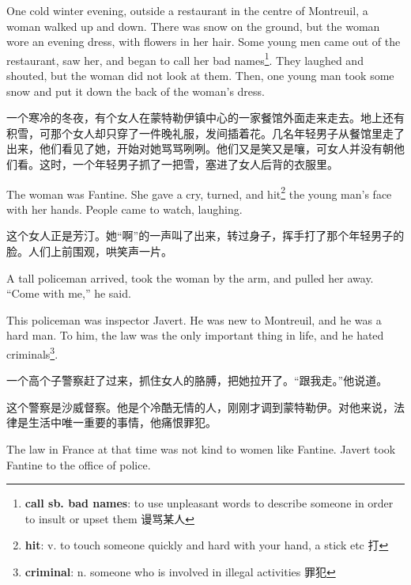 \documentclass[fontset=ubuntu, zihao=5]{ctexart}
\begin{document}
\begin{paracol}{2}
  \switchcolumn*

  One cold winter evening, outside a restaurant in the centre of Montreuil, a
  woman walked up and down. There was snow on the ground, but the woman wore
  an evening dress, with flowers in her hair. Some young men came out of the
  restaurant, saw her, and began to call her bad names\footnote{\textbf{call
      sb. bad names}: to use unpleasant words to describe someone in order to
    insult or upset them 谩骂某人}. They laughed and shouted, but the woman
  did not look at them. Then, one young man took some snow and put it down the
  back of the woman's dress.

  \switchcolumn

  一个寒冷的冬夜，有个女人在蒙特勒伊镇中心的一家餐馆外面走来走去。地上还有积雪，可那个女人却只穿了一件晚礼服，发间插着花。几名年轻男子从餐馆里走了出来，他们看见了她，开始对她骂骂咧咧。他们又是笑又是嚷，可女人并没有朝他们看。这时，一个年轻男子抓了一把雪，塞进了女人后背的衣服里。

  \switchcolumn*

  The woman was Fantine. She gave a cry, turned, and
  hit\footnote{\textbf{hit}: v. to touch someone quickly and hard with your
    hand, a stick etc 打} the young man's face with her hands. People came to
  watch, laughing.

  \switchcolumn

  这个女人正是芳汀。她“啊”的一声叫了出来，转过身子，挥手打了那个年轻男子的脸。人们上前围观，哄笑声一片。

  \switchcolumn*

  A tall policeman arrived, took the woman by the arm, and pulled her away. ``Come with me,'' he said.


  This policeman was inspector Javert. He was new to Montreuil, and he was a hard man. To him, the law was the only important thing in life, and he hated criminals\footnote{\textbf{criminal}: n. someone who is involved in illegal activities 罪犯}.

  \switchcolumn

  一个高个子警察赶了过来，抓住女人的胳膊，把她拉开了。“跟我走。”他说道。


  这个警察是沙威督察。他是个冷酷无情的人，刚刚才调到蒙特勒伊。对他来说，法律是生活中唯一重要的事情，他痛恨罪犯。

  \switchcolumn*

  The law in France at that time was not kind to women like Fantine. Javert took Fantine to the office of police.


\end{paracol}
\end{document}
